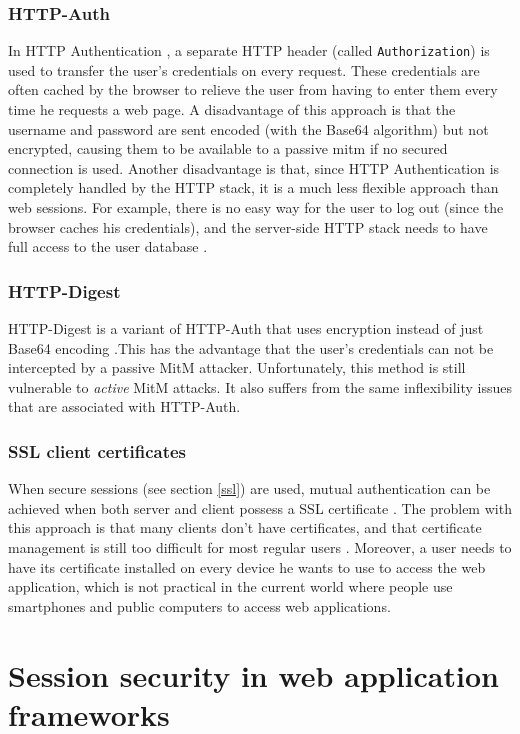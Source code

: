 \subsubsection{HTTP-Auth}
In HTTP Authentication \cite{rfc2617}, a separate HTTP header (called \texttt{Authorization}) is used to transfer the user's credentials on every request. These credentials are often cached by the browser to relieve the user from having to enter them every time he requests a web page. A disadvantage of this approach is that the username and password are sent encoded (with the Base64 algorithm) but not encrypted, causing them to be available to a passive \gls{mitm} if no secured connection is used. Another disadvantage is that, since HTTP Authentication is completely handled by the HTTP stack, it is a much less flexible approach than web sessions. For example, there is no easy way for the user to log out (since the browser caches his credentials), and the server-side HTTP stack needs to have full access to the user database \cite{Adida2008}.

\subsubsection{HTTP-Digest}
HTTP-Digest is a variant of HTTP-Auth that uses encryption instead of just Base64 encoding \cite{rfc2617}.This has the advantage that the user's credentials can not be intercepted by a passive MitM attacker. Unfortunately, this method is still vulnerable to \emph{active} MitM attacks. It also suffers from the same inflexibility issues that are associated with HTTP-Auth.

\subsubsection{SSL client certificates}\label{certificates}
When secure sessions (see section \ref{ssl}) are used, mutual authentication can be achieved when both server and client possess a SSL certificate \cite{Park2000}. The problem with this approach is that many clients don't have certificates, and that certificate management is still too difficult for most regular users \cite{Whitten1999}. Moreover, a user needs to have its certificate installed on every device he wants to use to access the web application, which is not practical in the current world where people use smartphones and public computers to access web applications.

\section{Session security in web application frameworks}\label{frameworks}

